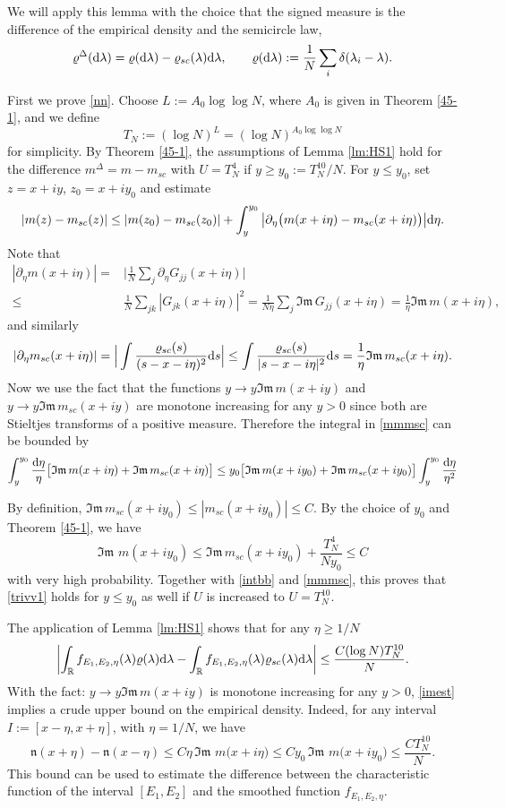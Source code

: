 \documentclass[draft]{article}
\newcommand{\rd}{{\rm d}}
\newcommand{\be}{\begin{equation}}
\newcommand{\ee}{\end{equation}}
\newcommand{\la}{\lambda}
\newcommand{\im}{{\mathfrak{Im} \, }}
\newcommand{\R}{{\mathbb R }}
\numberwithin{equation}{section}
\numberwithin{theorem}{section}
\numberwithin{definition}{section}
\numberwithin{remark}{section}
\begin{document}
We will apply this lemma with the choice that the  signed measure is
the difference of the empirical density and the semicircle law,
$$
  \varrho^\Delta(\rd \la)=\varrho(\rd\la) - \varrho_{sc}(\la)\rd \la,\qquad
\varrho(\rd\la):=\frac{1}{N}\sum_i \delta(\lambda_i-\la).
$$


First we prove \eqref{nn}. Choose $L:=A_0 \log\log N$, where $A_0$ is given
in  Theorem \ref{45-1}, and we define 
$$
    T_N:= (\log N)^L = (\log N)^{A_0\log\log N}
$$
for simplicity.
 By  Theorem \ref{45-1}, the assumptions of Lemma \ref{lm:HS1} hold for 
the difference  $m^\Delta =m-m_{sc}$ with $U=T_N^4$
 if $y\ge y_0 := T_N^{10}/N $.
For $y\le y_0  $,  set $z=x+iy$, $z_0=x+iy_0$ and
estimate
\be\label{mmmsc}
   |  m(z)-m_{sc}(z)|\le   |  m(z_0)-m_{sc}(z_0)|
  + \int_y^{y_0} \big| \partial_\eta 
\big(m(x+i\eta)-m_{sc}(x+i\eta)\big)\big|\rd \eta.
\ee
Note that
\begin{align}
   |\partial_\eta m(x +i\eta)| 
   = & \Big|\frac{1}{N}\sum_j \partial_\eta G_{jj}(x+i\eta)\Big|
 \\ \le & \frac{1}{N}\sum_{jk} |G_{jk}(x+i\eta)|^2 =
 \frac{1}{N\eta }\sum_j \im G_{jj}(x+i\eta) = \frac{1}{\eta}\im m(x+i\eta),
\end{align}
and similarly
$$
  |\partial_\eta m_{sc}(x+i\eta)| = 
\Big|\int \frac{\varrho_{sc}(s)}{(s-x-i\eta)^2}\rd s\Big|
\le \int \frac{\varrho_{sc}(s)}{|s-x-i\eta|^2}\rd s
 = \frac{1}{\eta} \im m_{sc}(x+i\eta).
$$
Now we use the fact that the functions $y\to y\im m(x+iy)$ and
$y\to y\im m_{sc}(x+iy)$ are monotone increasing for any $y>0$
since both are Stieltjes transforms of a positive measure.
Therefore the integral in \eqref{mmmsc} can be bounded by
\be\label{intbb}
   \int_y^{y_0} \frac{\rd \eta}{\eta} \big[ \im  m(x+i\eta) +  
\im m_{sc}(x+i\eta)\big] 
\le  y_0\big[ \im m(x+iy_0) +  
\im m_{sc}(x+iy_0)\big]  \int_y^{y_0} \frac{\rd \eta}{\eta^2}
\ee

By definition, $\im m_{sc}(x+iy_0)  \leq |m_{sc}(x+iy_0)| \le C$. By the choice of $y_0$ and  Theorem \ref{45-1},  we have 
\be
     \im \, m(x+iy_0) \le
   \im m_{sc}(x+ i y_0) + \frac {T_N^4} {N y_0} 
\le C 
\label{imest}
\ee
with very high probability.
 Together with \eqref{intbb} and \eqref{mmmsc}, 
this proves that \eqref{trivv1} holds for $y\le y_0  $
as well if $U$ is increased to $U=T_N^{10}$.


The application of Lemma \ref{lm:HS1} shows that for any $\eta\ge 1/N$
\be
   \left|\int_\R f_{E_1,E_2,\eta}(\lambda)\varrho(\la) \rd\lambda
 -\int_\R f_{E_1,E_2,\eta}(\lambda) \varrho_{sc}(\lambda)\rd\lambda \right|  \le
  \frac{C (\log N)T_N^{10}}{N}.
\label{genHS2}
\ee
With the fact: $y\to y\im m(x+iy)$ is  monotone increasing for any $y>0$,  \eqref{imest} implies a crude upper bound on the empirical density. Indeed,  for any interval $I:=[x-\eta, x+\eta]$, with $\eta=1/N$, we have 
\be
   {\mathfrak n}(x+\eta)- {\mathfrak n}(x-\eta ) \le C\eta\,\im \, m\big( x+ i\eta\big)
 \le Cy_0\,\im \, m\big( x+ iy_0\big)\leq \frac{CT_N^{10}}{N}.
\label{density}
\ee
This bound can be used to estimate the difference between
the characteristic function of the interval $[E_1,E_2]$ and
the smoothed function $ f_{E_1,E_2,\eta}$.
\end{document}
